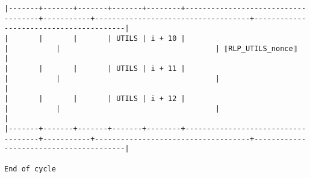 \documentclass[varwidth=\maxdimen,margin=0.5cm,multi={verbatim}]{standalone}
\begin{document}
\begin{verbatim}
|-------+-------+-------+-------+--------+------------------------------------+-----------+------------------------------------+----------------------------------------|
|       |       |       | UTILS | i + 10 |                                    |           |                                    | ⟦RLP_UTILS_nonce⟧                      |
|       |       |       | UTILS | i + 11 |                                    |           |                                    |                                        |
|       |       |       | UTILS | i + 12 |                                    |           |                                    |                                        |
|-------+-------+-------+-------+--------+------------------------------------+-----------+------------------------------------+----------------------------------------|

End of cycle

\end{verbatim}
\end{document}
